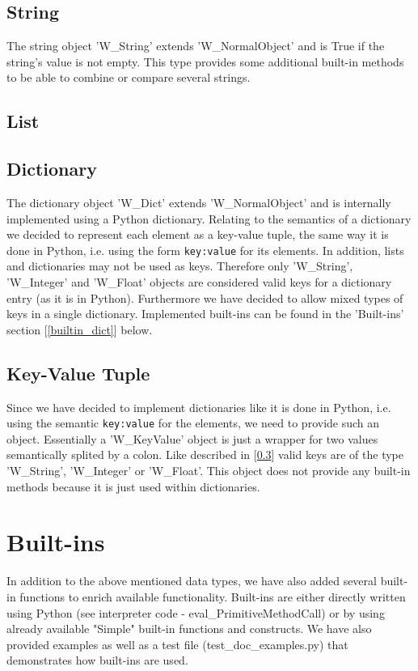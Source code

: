 \documentclass{article}
\begin{document}
\subsection{String}
The string object 'W\_String' extends 'W\_NormalObject' and is True if the string's value is not empty.
This type provides some additional built-in methods to be able to combine or compare several strings.

\subsection{List}

\subsection{Dictionary}
\label{dicts}
The dictionary object 'W\_Dict' extends 'W\_NormalObject' and is internally implemented using a Python dictionary.
Relating to the semantics of a dictionary we decided to represent each element as a key-value tuple, the same way it is done in Python, i.e. using the form \texttt{key:value} for its elements. In addition, lists and dictionaries may not be used as keys. Therefore only 'W\_String', 'W\_Integer' and 'W\_Float' objects are considered valid keys for a dictionary entry (as it is in Python). Furthermore we have decided to allow mixed types of keys in a single dictionary. Implemented built-ins can be found in the 'Built-ins' section [\ref{builtin_dict}] below.

\subsection{Key-Value Tuple}
Since we have decided to implement dictionaries like it is done in Python, i.e. using the semantic \texttt{key:value} for the elements, we need to provide such an object.
Essentially a 'W\_KeyValue' object is just a wrapper for two values semantically splited by a colon.
Like described in [\ref{dicts}] valid keys are of the type 'W\_String', 'W\_Integer' or 'W\_Float'. This object does not provide any built-in methods because it is just used within dictionaries.

\section{Built-ins}
In addition to the above mentioned data types, we have also added several built-in functions to enrich available functionality. Built-ins are either directly written using Python (see interpreter code - eval\_PrimitiveMethodCall) or by using already available "Simple" built-in functions and constructs. We have also provided examples as well as a test file (test\_doc\_examples.py) that demonstrates how built-ins are used.
\end{document}
